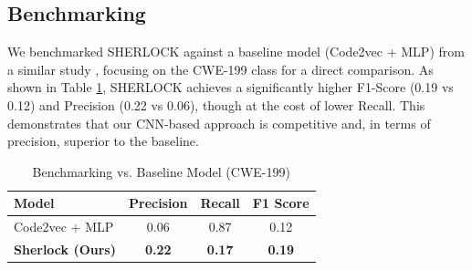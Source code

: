 \documentclass[conference]{IEEEtran}
\newcommand{\MYhyperreffix}{}
\let\MYhyperreffix\cite
\renewcommand{\cite}[1]{\MYhyperreffix{#1}}
\begin{document}
\begin{table}[ht]
\centering
\caption{Model Performance Metrics}
\label{tab:performance}
\end{table}

\subsection{Benchmarking}
We benchmarked SHERLOCK against a baseline model (Code2vec + MLP) from a similar study \cite{bilgin_vulnerability_2020}, focusing on the CWE-199 class for a direct comparison. As shown in Table \ref{tab:benchmarking}, SHERLOCK achieves a significantly higher F1-Score (0.19 vs 0.12) and Precision (0.22 vs 0.06), though at the cost of lower Recall. This demonstrates that our CNN-based approach is competitive and, in terms of precision, superior to the baseline.

\begin{table}[ht]
\centering
\caption{Benchmarking vs. Baseline Model (CWE-199)}
\label{tab:benchmarking}
\begin{tabular}{@{}lccc@{}}
\toprule
\textbf{Model}                & \textbf{Precision} & \textbf{Recall} & \textbf{F1 Score} \\
\midrule
Code2vec + MLP \cite{bilgin_vulnerability_2020} & 0.06               & 0.87            & 0.12              \\
\textbf{Sherlock (Ours)}      & \textbf{0.22}      & \textbf{0.17}   & \textbf{0.19}     \\
\bottomrule
\end{tabular}
\end{table}
\end{document}
